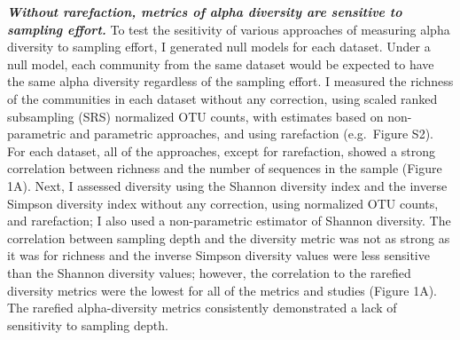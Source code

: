 \documentclass[
]{article}
\begin{document}
\textbf{\emph{Without rarefaction, metrics of alpha diversity are
sensitive to sampling effort.}} To test the sesitivity of various
approaches of measuring alpha diversity to sampling effort, I generated
null models for each dataset. Under a null model, each community from
the same dataset would be expected to have the same alpha diversity
regardless of the sampling effort. I measured the richness of the
communities in each dataset without any correction, using scaled ranked
subsampling (SRS) normalized OTU counts, with estimates based on
non-parametric and parametric approaches, and using rarefaction
(e.g.~Figure S2). For each dataset, all of the approaches, except for
rarefaction, showed a strong correlation between richness and the number
of sequences in the sample (Figure 1A). Next, I assessed diversity using
the Shannon diversity index and the inverse Simpson diversity index
without any correction, using normalized OTU counts, and rarefaction; I
also used a non-parametric estimator of Shannon diversity. The
correlation between sampling depth and the diversity metric was not as
strong as it was for richness and the inverse Simpson diversity values
were less sensitive than the Shannon diversity values; however, the
correlation to the rarefied diversity metrics were the lowest for all of
the metrics and studies (Figure 1A). The rarefied alpha-diversity
metrics consistently demonstrated a lack of sensitivity to sampling
depth.
\end{document}

